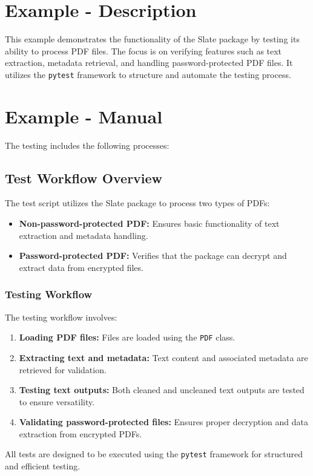 \section{Example - Description}
This example demonstrates the functionality of the Slate package by testing its ability to process PDF files. The focus is on verifying features such as text extraction, metadata retrieval, and handling password-protected PDF files. It utilizes the \texttt{pytest} framework to structure and automate the testing process.

\section{Example - Manual}
The testing includes the following processes:
\subsection{Test Workflow Overview}
The test script utilizes the Slate package to process two types of PDFs:
\begin{itemize}
	\item \textbf{Non-password-protected PDF:} Ensures basic functionality of text extraction and metadata handling.
	\item \textbf{Password-protected PDF:} Verifies that the package can decrypt and extract data from encrypted files.
\end{itemize}

\subsubsection{Testing Workflow}
The testing workflow involves:
\begin{enumerate}
	\item \textbf{Loading PDF files:} Files are loaded using the \texttt{PDF} class.
	\item \textbf{Extracting text and metadata:} Text content and associated metadata are retrieved for validation.
	\item \textbf{Testing text outputs:} Both cleaned and uncleaned text outputs are tested to ensure versatility.
	\item \textbf{Validating password-protected files:} Ensures proper decryption and data extraction from encrypted PDFs.
\end{enumerate}

\noindent All tests are designed to be executed using the \texttt{pytest} framework for structured and efficient testing.

